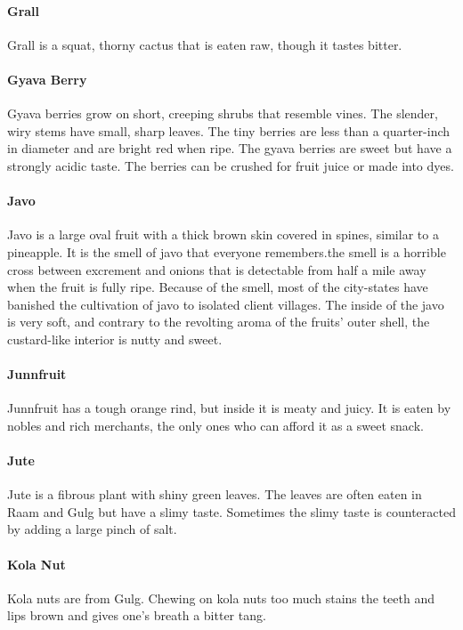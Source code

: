 \begin{multicols}{2}
\paragraph{Grall} Grall is a squat, thorny cactus that is eaten raw, though it tastes bitter.\\
\paragraph{Gyava Berry} Gyava berries grow on short, creeping shrubs that resemble vines. The slender, wiry stems have small, sharp leaves. The tiny berries are less than a quarter-inch in diameter and are bright red when ripe. The gyava berries are sweet but have a strongly acidic taste. The berries can be crushed for fruit juice or made into dyes.\\
\paragraph{Javo} Javo is a large oval fruit with a thick brown skin covered in spines, similar to a pineapple. It is the smell of javo that everyone remembers.the smell is a horrible cross between excrement and onions that is detectable from half a mile away when the fruit is fully ripe. Because of the smell, most of the city-states have banished the cultivation of javo to isolated client villages. The inside of the javo is very soft, and contrary to the revolting aroma of the fruits' outer shell, the custard-like interior is nutty and sweet.\\
\paragraph{Junnfruit} Junnfruit has a tough orange rind, but inside it is meaty and juicy. It is eaten by nobles and rich merchants, the only ones who can afford it as a sweet snack.\\
\paragraph{Jute} Jute is a fibrous plant with shiny green leaves. The leaves are often eaten in Raam and Gulg but have a slimy taste. Sometimes the slimy taste is counteracted by adding a large pinch of salt.\\
\paragraph{Kola Nut} Kola nuts are from Gulg. Chewing on kola nuts too much stains the teeth and lips brown and gives one's breath a bitter tang.\\

\end{multicols}
